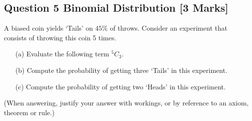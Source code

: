 
\newpage

\subsection*{Question 5 Binomial Distribution [3 Marks] } %
A biased coin yields `Tails' on $45\%$ of throws. Consider an experiment that consists of throwing this coin 5 times.
\begin{itemize}
\item[(a)]  Evaluate the following term $^{5}C_3$.
\item[(b)]  Compute the probability of getting three `Tails' in this experiment.
\item[(c)]  Compute the probability of getting two `Heads' in this experiment.
\end{itemize}

\noindent(When answering, justify your answer with workings, or by reference to an
axiom, theorem or rule.)

\bigskip




